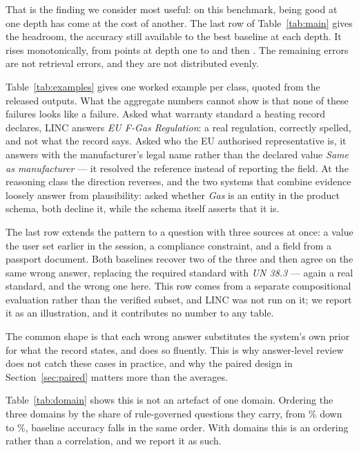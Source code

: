 \documentclass[conference]{IEEEtran}
\begin{document}
That is the finding we consider most useful: on this benchmark, being good at
one depth has come at the cost of another. The last row of Table~\ref{tab:main}
gives the headroom, the accuracy still available to the best baseline at each
depth. It rises monotonically, from \HeadroomRecall{} points at depth one to
\HeadroomOpen{} and then \HeadroomLogic{}. The remaining errors are not
retrieval errors, and they are not distributed evenly.



Table~\ref{tab:examples} gives one worked example per class, quoted from the
released outputs. What the aggregate numbers cannot show is that none of these
failures looks like a failure. Asked what warranty standard a heating record
declares, LINC answers \emph{EU F-Gas Regulation}: a real regulation, correctly
spelled, and not what the record says. Asked who the EU authorised
representative is, it answers with the manufacturer's legal name rather than the
declared value \emph{Same as manufacturer} --- it resolved the reference instead
of reporting the field. At the reasoning class the direction reverses, and the
two systems that combine evidence loosely answer from plausibility: asked
whether \emph{Gas} is an entity in the product schema, both decline it, while
the schema itself asserts that it is.

The last row extends the pattern to a question with three sources at once: a
value the user set earlier in the session, a compliance constraint, and a field
from a passport document. Both baselines recover two of the three and then agree
on the same wrong answer, replacing the required standard with \emph{UN 38.3} ---
again a real standard, and the wrong one here. This row comes from a separate
compositional evaluation rather than the verified subset, and LINC was not run
on it; we report it as an illustration, and it contributes no number to any
table.

The common shape is that each wrong answer substitutes the system's own prior
for what the record states, and does so fluently. This is why answer-level
review does not catch these cases in practice, and why the paired design in
Section~\ref{sec:paired} matters more than the averages.

Table~\ref{tab:domain} shows this is not an artefact of one domain. Ordering the
three domains by the share of rule-governed questions they carry, from
\ShareMostRule\% down to \ShareLeastRule\%, baseline accuracy falls in the same
order. With \VerifiedDomains{} domains this is an ordering rather than a
correlation, and we report it as such.
\end{document}
